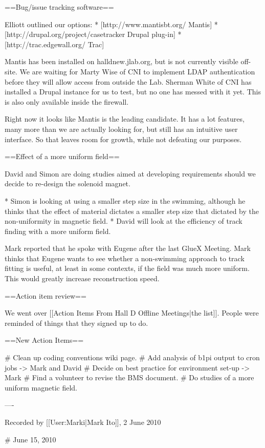 ==Bug/issue tracking software==

Elliott outlined our options:
* [http://www.mantisbt.org/ Mantis]
* [http://drupal.org/project/casetracker Drupal plug-in]
* [http://trac.edgewall.org/ Trac]

Mantis has been installed on halldnew.jlab.org, but is not currently visible off-site. We are waiting for Marty Wise of CNI to implement LDAP authentication before they will allow access from outside the Lab. Sherman White of CNI has installed a Drupal instance for us to test, but no one has messed with it yet. This is also only available inside the firewall.

Right now it looks like Mantis is the leading candidate. It has a lot features, many more than we are actually looking for, but still has an intuitive user interface. So that leaves room for growth, while not defeating our purposes.

==Effect of a more uniform field==

David and Simon are doing studies aimed at developing requirements should we decide to re-design the solenoid magnet.

* Simon is looking at using a smaller step size in the swimming, although he thinks that the effect of material dictates a smaller step size that dictated by the non-uniformity in magnetic field.
* David will look at the efficiency of track finding with a more uniform field.

Mark reported that he spoke with Eugene after the last GlueX Meeting. Mark thinks that Eugene wants to see whether a non-swimming approach to track fitting is useful, at least in some contexts, if the field was much more uniform. This would greatly increase reconstruction speed.

==Action item review==

We went over [[Action Items From Hall D Offline Meetings|the list]]. People were reminded of things that they signed up to do.

==New Action Items==

# Clean up coding conventions wiki page.
# Add analysis of b1pi output to cron jobs -> Mark and David
# Decide on best practice for environment set-up -> Mark
# Find a volunteer to revise the BMS document.
# Do studies of a more uniform magnetic field.

----

Recorded by [[User:Marki|Mark Ito]], 2 June 2010


# June 15, 2010

